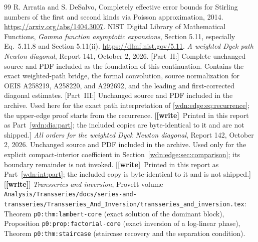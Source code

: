 \documentclass[11pt,letterpaper]{article}
\theoremstyle{remark}\newtheorem{remark}[theorem]{Remark}
\newcommand{\file}[1]{\nolinkurl{#1}}
\newcommand{\wtag}{\textup{\textbf{[write]}}}
\begin{document}
\begin{thebibliography}{99}
 R. Arratia and S. DeSalvo,
Completely effective error bounds for Stirling numbers of the first and
second kinds via Poisson approximation, 2014.
\url{https://arxiv.org/abs/1404.3007}.
 NIST Digital Library of Mathematical Functions,
\emph{Gamma function asymptotic expansions}, Section 5.11, especially
Eq.~5.11.8 and Section 5.11(ii). \url{https://dlmf.nist.gov/5.11}.
 \emph{A weighted Dyck path Newton diagonal}, Report 141,
October 2, 2026. [Part~II:] Complete unchanged source and PDF included as the
foundation of this continuation. Contains the exact weighted-path bridge,
the formal convolution, source normalization for OEIS A258219, A258220,
and A292692, and the leading and first-corrected diagonal estimates.
[Part~III:] Unchanged source and PDF included in the
archive. Used here for the exact path interpretation of
\eqref{wdn:edge:eq:recurrence}; the upper-edge proof starts from the recurrence.
[\wtag\ Printed in this report as Part~\ref{wdn:dia:part}; the included copies are byte-identical to it and are not shipped.]
 \emph{All orders for the weighted Dyck Newton diagonal},
Report 142, October 2, 2026. Unchanged source and PDF included in the
archive. Used only for the explicit compact-interior coefficient in
Section~\ref{wdn:edge:sec:comparison}; its boundary remainder is not invoked.
[\wtag\ Printed in this report as Part~\ref{wdn:int:part}; the included copy is byte-identical to it and is not shipped.]
 [\wtag] \emph{Transseries and inversion}, ProveIt volume
\file{Analysis/Transseries/docs/series-and-transseries/Transseries_And_Inversion/transseries_and_inversion.tex}:
Theorem \texttt{p0:thm:lambert-core} (exact solution of the dominant block),
Proposition \texttt{p0:prop:factorial-core} (exact inversion of a log-linear phase),
Theorem \texttt{p0:thm:staircase} (staircase recovery and the separation condition).
\end{thebibliography}
\end{document}
